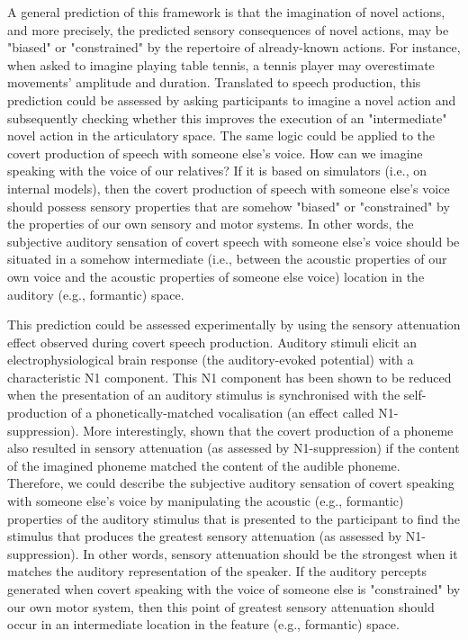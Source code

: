 \documentclass[utf8]{template/frontiersSCNS} %
\begin{document}
A general prediction of this framework is that the imagination of novel actions, and more precisely, the predicted sensory consequences of novel actions, may be "biased" or "constrained" by the repertoire of already-known actions. For instance, when asked to imagine playing table tennis, a tennis player may overestimate movements' amplitude and duration. Translated to speech production, this prediction could be assessed by asking participants to imagine a novel action and subsequently checking whether this improves the execution of an "intermediate" novel action in the articulatory space. The same logic could be applied to the covert production of speech with someone else's voice. How can we imagine speaking with the voice of our relatives? If it is based on simulators (i.e., on internal models), then the covert production of speech with someone else's voice should possess sensory properties that are somehow "biased" or "constrained" by the properties of our own sensory and motor systems. In other words, the subjective auditory sensation of covert speech with someone else's voice should be situated in a somehow intermediate (i.e., between the acoustic properties of our own voice and the acoustic properties of someone else voice) location in the auditory (e.g., formantic) space.


This prediction could be assessed experimentally by using the sensory attenuation effect observed during covert speech production. Auditory stimuli elicit an electrophysiological brain response (the auditory-evoked potential) with a characteristic N1 component. This N1 component has been shown to be reduced when the presentation of an auditory stimulus is synchronised with the self-production of a phonetically-matched vocalisation (an effect called N1-suppression). More interestingly, \cite{whitford_neurophysiological_2017} shown that the covert production of a phoneme also resulted in sensory attenuation (as assessed by N1-suppression) if the content of the imagined phoneme matched the content of the audible phoneme. Therefore, we could describe the subjective auditory sensation of covert speaking with someone else’s voice by manipulating the acoustic (e.g., formantic) properties of the auditory stimulus that is presented to the participant to find the stimulus that produces the greatest sensory attenuation (as assessed by N1-suppression). In other words, sensory attenuation should be the strongest when it matches the auditory representation of the speaker. If the auditory percepts generated when covert speaking with the voice of someone else is "constrained" by our own motor system, then this point of greatest sensory attenuation should occur in an intermediate location in the feature (e.g., formantic) space.
\end{document}
